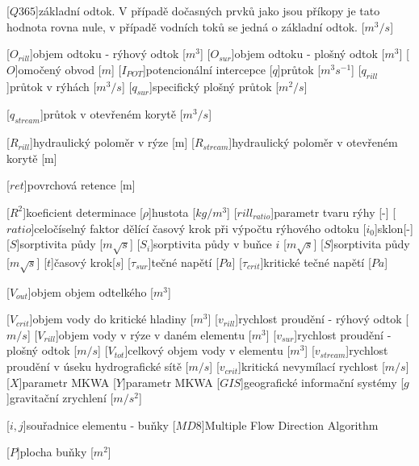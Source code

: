 \begin{acronym}
[$Q365$]{základní odtok. V případě dočasných prvků jako jsou příkopy je tato hodnota rovna nule, v případě vodních toků se jedná o základní odtok. [$m^3/s$]}

[$O_{rill}$]{objem odtoku - rýhový odtok [$m^{3}$]}
[$O_{sur}$]{objem odtoku - plošný odtok [$m^{3}$]}
[$O$]{omočený obvod [$m$]}
[$I_{POT}$]{potencionální intercepce}
[$q$]{průtok [$m^{3}{s}^{-1}$]}
[$q_{rill}$]{průtok v rýhách [$m^{3}/s$]}
[$q_{sur}$]{specifický plošný průtok [$m^{2}/s$]}

[$q_{stream}$]{průtok v otevřeném korytě [$m^{3}/s$]}

[$R_{rill}$]{hydraulický poloměr v rýze [m]}
[$R_{stream}$]{hydraulický poloměr v otevřeném korytě [m]}

[$ret$]{povrchová retence [m]}

[$R^2$]{koeficient determinace}
[$\rho$]{hustota [$kg/m^{3}$]}
[$rill_{ratio}$]{parametr tvaru rýhy [-]}
[$ratio$]{celočíselný faktor dělící časový krok při výpočtu rýhového odtoku}
[$i_{0}$]{sklon[-]}
[$S$]{sorptivita půdy [$m \sqrt{s}$]}
[$S_{i}$]{sorptivita půdy  v buňce $i$  [$m \sqrt{s}$]}
[$S$]{sorptivita půdy [$m \sqrt{s}$]}
[$t$]{časový krok[$s$]}
[$\tau_{sur}$]{tečné napětí [$Pa$]}
[$\tau_{crit}$]{kritické tečné napětí [$Pa$]}

[$V_{out}$]{objem objem odtelkého [$m^{3}$]}

[$V_{crit}$]{objem vody do kritické hladiny [$m^{3}$]}
[$v_{rill}$]{rychlost proudění - rýhový odtok [$m/s$]}
[$V_{rill}$]{objem vody v rýze v daném elementu [$m^{3}$]}
[$v_{sur}$]{rychlost proudění - plošný odtok [$m/s$]}
[$V_{tot}$]{celkový objem vody v elementu [$m^{3}$]}
[$v_{stream}$]{rychlost proudění v úseku hydrografické sítě [$m/s$]}
[$v_{crit}$]{kritická nevymílací rychlost [$m/s$]}
[$X$]{parametr MKWA}
[$Y$]{parametr MKWA}
[$GIS$]{geografické informační systémy}
[$g$]{gravitační zrychlení [$m/s^{2}$]}

[$i, j$]{souřadnice elementu - buňky}
[$MD8$]{Multiple Flow Direction Algorithm}

[$P$]{plocha buňky [$m^2$]}



\end{acronym}
